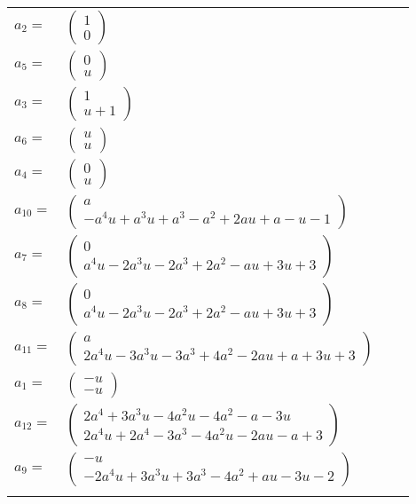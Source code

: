 \documentclass[1p]{elsarticle_modified}
\theoremstyle{definition}
\begin{document}
\begin{tabular}{m{7pt} m{180pt} m{7pt} m{180pt} }
\flushright $a_{2}=$&$\begin{pmatrix}1\\0\end{pmatrix}$ \\
\flushright $a_{5}=$&$\begin{pmatrix}0\\u\end{pmatrix}$ \\
\flushright $a_{3}=$&$\begin{pmatrix}1\\u+1\end{pmatrix}$ \\
\flushright $a_{6}=$&$\begin{pmatrix}u\\u\end{pmatrix}$ \\
\flushright $a_{4}=$&$\begin{pmatrix}0\\u\end{pmatrix}$ \\
\flushright $a_{10}=$&$\begin{pmatrix}a\\- a^4 u+a^3 u+a^3- a^2+2 a u+a- u-1\end{pmatrix}$ \\
\flushright $a_{7}=$&$\begin{pmatrix}0\\a^4 u-2 a^3 u-2 a^3+2 a^2- a u+3 u+3\end{pmatrix}$ \\
\flushright $a_{8}=$&$\begin{pmatrix}0\\a^4 u-2 a^3 u-2 a^3+2 a^2- a u+3 u+3\end{pmatrix}$ \\
\flushright $a_{11}=$&$\begin{pmatrix}a\\2 a^4 u-3 a^3 u-3 a^3+4 a^2-2 a u+a+3 u+3\end{pmatrix}$ \\
\flushright $a_{1}=$&$\begin{pmatrix}- u\\- u\end{pmatrix}$ \\
\flushright $a_{12}=$&$\begin{pmatrix}2 a^4+3 a^3 u-4 a^2 u-4 a^2- a-3 u\\2 a^4 u+2 a^4-3 a^3-4 a^2 u-2 a u- a+3\end{pmatrix}$ \\
\flushright $a_{9}=$&$\begin{pmatrix}- u\\-2 a^4 u+3 a^3 u+3 a^3-4 a^2+a u-3 u-2\end{pmatrix}$\\&\end{tabular}
\end{document}
